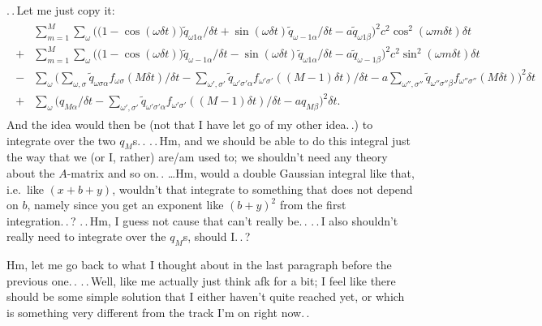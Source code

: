 \documentclass{report}
\begin{document}
.\,.\,Let me just copy it:
\begin{align}
\begin{aligned}
	&\sum_{m=1}^{M} \sum_{\omega}
		\Big(
			\big(1 - \cos(\omega\delta t)\big) \tilde q_{\omega 1\alpha}  / \delta t +
			\sin(\omega\delta t) \tilde q_{\omega-1\alpha} / \delta t -
			a \tilde q_{\omega 1\beta}
		\Big)^2 
		c^2 \cos^2(\omega m \delta t)
		\delta t\\
	+&\sum_{m=1}^{M} \sum_{\omega}
		\Big(
			\big(1 - \cos(\omega\delta t)\big) \tilde q_{\omega-1\alpha}  / \delta t -
			\sin(\omega\delta t) \tilde q_{\omega 1\alpha} / \delta t -
			a \tilde q_{\omega-1\beta}
		\Big)^2 
		c^2 \sin^2(\omega m \delta t)
		\delta t\\
	-&\sum_{\omega}
		\bigg( 
			\sum_{\omega, \sigma} 
				\tilde q_{\omega\sigma\alpha}
				f_{\omega \sigma}(M\delta t) 
				/ \delta t 
			- 
			\sum_{\omega', \sigma'} 
				\tilde q_{\omega'\sigma'\alpha}
				f_{\omega' \sigma'}((M-1) \delta t) 
			 	/ \delta t 
			- 
			a \sum_{\omega'', \sigma''} 
				\tilde q_{\omega''\sigma''\beta}
				f_{\omega'' \sigma''}(M \delta t) 
		\bigg)^2 
		\delta t\\
	+&\sum_{\omega}
		\bigg( 
			q_{M\alpha}	/ \delta t 
			- 
			\sum_{\omega', \sigma'} 
				\tilde q_{\omega'\sigma'\alpha}
				f_{\omega' \sigma'}((M-1) \delta t) 
			 	/ \delta t 
			- 
			a q_{M\beta}
		\bigg)^2 
		\delta t.
\end{aligned}
\end{align}
And the idea would then be (not that I have let go of my other idea.\,.) to integrate over the two $q_M$s.\,. .\,.\,Hm, and we should be able to do this integral just the way that we (or I, rather) are/am used to; we shouldn't need any theory about the $A$-matrix and so on.\,. \ldots Hm, would a double Gaussian integral like that, i.e.\ like $(x + b + y)$, wouldn't that integrate to something that does not depend on $b$, namely since you get an exponent like $(b + y)^2$ from the first integration.\,.\,? .\,.\,Hm, I guess not cause that can't really be.\,. .\,.\,I also shouldn't really need to integrate over the $q_M$s, should I.\,.\,? 

Hm, let me go back to what I thought about in the last paragraph before the previous one.\,. .\,.\,Well, like me actually just think afk for a bit; I feel like there should be some simple solution that I either haven't quite reached yet, or which is something very different from the track I'm on right now.\,. %
\end{document}
